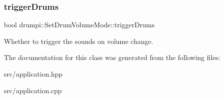 \subsubsection{\texorpdfstring{trigger\+Drums}{triggerDrums}}
{\footnotesize\ttfamily bool drumpi\+::\+Set\+Drum\+Volume\+Mode\+::trigger\+Drums\hspace{0.3cm}{\ttfamily [private]}}

Whether to trigger the sounds on volume change. 

The documentation for this class was generated from the following files\+:\begin{DoxyCompactItemize}
\item 
src/application.\+hpp\item 
src/application.\+cpp\end{DoxyCompactItemize}
